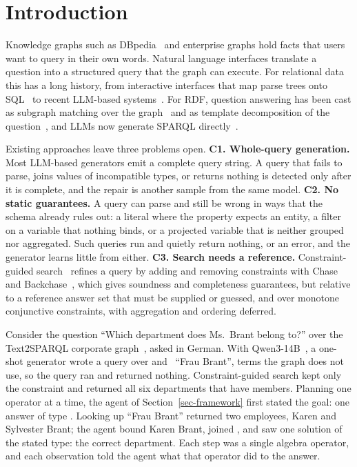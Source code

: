 \section{Introduction}
\label{sec-intro}

Knowledge graphs such as DBpedia~\cite{auer2007dbpedia} and enterprise
graphs hold facts that users want to query in their own words.
Natural language interfaces translate a question into a structured
query that the graph can execute.
For relational data this has a long history, from interactive
interfaces that map parse trees onto SQL~\cite{li2014nalir} to recent
LLM-based systems~\cite{gao2024dailsql,li2024codes,ren2024purple,li2024dawn}.
For RDF, question answering has been cast as subgraph matching over the
graph~\cite{zou2014natural} and as template decomposition of the
question~\cite{zheng2018question}, and LLMs now generate SPARQL
directly~\cite{smeros2026sparqlllm,wang2026uniqgen,brei2025aruqula}.

Existing approaches leave three problems open.
\textbf{C1. Whole-query generation.}
Most LLM-based generators emit a complete query string.
A query that fails to parse, joins values of incompatible types, or
returns nothing is detected only after it is complete, and the repair
is another sample from the same model.
\textbf{C2. No static guarantees.}
A query can parse and still be wrong in ways that the schema already
rules out: a literal where the property expects an entity, a filter on
a variable that nothing binds, or a projected variable that is neither
grouped nor aggregated.
Such queries run and quietly return nothing, or an error, and the
generator learns little from either.
\textbf{C3. Search needs a reference.}
Constraint-guided search~\cite{wang2026uniqgen} refines a query by
adding and removing constraints with Chase and
Backchase~\cite{deutsch1999chase}, which gives soundness and
completeness guarantees, but relative to a reference answer set that
must be supplied or guessed, and over monotone conjunctive constraints,
with aggregation and ordering deferred.

\begin{example}
\label{exa-motivation}
Consider the question ``Which department does Ms.~Brant belong to?''
over the Text2SPARQL corporate graph~\cite{text2sparql}, asked in
German.
With Qwen3-14B~\cite{yang2025qwen3}, a one-shot generator wrote a query
over  and ~``Frau Brant'', terms the
graph does not use, so the query ran and returned nothing.
Constraint-guided search kept only the constraint
 and returned all six departments that have members.
Planning one operator at a time, the agent of
Section~\ref{sec-framework} first stated the goal: one answer of type
.
Looking up ``Frau Brant'' returned two employees, Karen and Sylvester
Brant; the agent bound Karen Brant, joined ,
and saw one solution of the stated type: the correct department.
Each step was a single algebra operator, and each observation told the
agent what that operator did to the answer.
\end{example}

